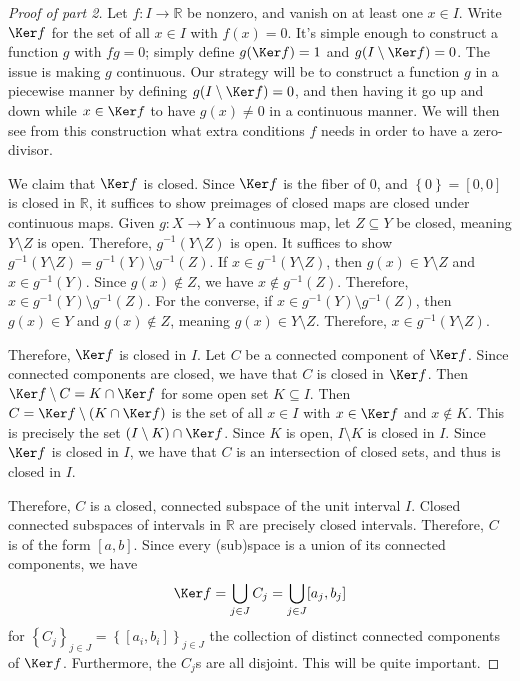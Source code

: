 \documentclass[11pt, letterpaper]{article}
\theoremstyle{plain}
\begin{document}
\begin{proof}[Proof of part 2]
	Let $f : I \to \mathbb{R} $ be nonzero, and vanish on at least one $x\in I$. Write $\Ker f$ for the set of all $x\in I$ with $f(x)=0$. It's simple enough to construct a function $g$ with $fg=0$; simply define $g(\Ker f)=1$ and $g(I \setminus \Ker f)=0$. The issue is making $g$ continuous. Our strategy will be to construct a function $g$ in a piecewise manner by defining $g(I \setminus \Ker f)=0$, and then having it go up and down while $x\in\Ker f$ to have $g(x)\neq 0$ in a continuous manner. We will then see from this construction what extra conditions $f$ needs in order to have a zero-divisor.

	We claim that $\Ker f$ is closed. Since $\Ker f$ is the fiber of 0, and $\left\{ 0 \right\} =[0,0]$ is closed in $\mathbb{R} $, it suffices to show preimages of closed maps are closed under continuous maps. Given $g : X \to Y$ a continuous map, let $Z\subseteq Y$ be closed, meaning $Y\setminus Z$ is open. Therefore, $g^{-1} (Y\setminus Z)$ is open. It suffices to show $g^{-1} (Y\setminus Z)=g^{-1} (Y)\setminus g^{-1} (Z)$. If $x\in g^{-1} (Y\setminus Z)$, then $g(x)\in Y\setminus Z$ and $x\in g^{-1} (Y)$. Since $g(x)\notin Z$, we have $x\notin g^{-1} (Z)$. Therefore, $x\in g^{-1} (Y)\setminus g^{-1} (Z)$. For the converse, if $x\in g^{-1} (Y)\setminus g^{-1} (Z)$, then $g(x)\in Y$ and $g(x)\notin Z$, meaning $g(x)\in Y\setminus Z$. Therefore, $x\in g^{-1} (Y\setminus Z)$.

	Therefore, $\Ker f$ is closed in $I$. Let $C$ be a connected component of $\Ker f$. Since connected components are closed, we have that $C$ is closed in $\Ker f$. Then $\Ker f\setminus C=K \cap \Ker f$ for some open set $K\subseteq I$. Then $C=\Ker f \setminus (K \cap \Ker f)$ is the set of all $x\in I$ with $x\in \Ker f$ and $x\notin K$. This is precisely the set $(I\setminus K) \cap \Ker f$. Since $K$ is open, $I\setminus K$ is closed in $I$. Since $\Ker f$ is closed in $I$, we have that $C$ is an intersection of closed sets, and thus is closed in $I$.

	Therefore, $C$ is a closed, connected subspace of the unit interval $I$. Closed connected subspaces of intervals in $\mathbb{R} $ are precisely closed intervals. Therefore, $C$ is of the form $[a,b]$. Since every (sub)space is a union of its connected components, we have
	\[
		\Ker f=\bigcup_{j\in J} C_j=\bigcup_{j\in J} [a_j,b_j]
	\]
	for $\left\{ C_j \right\}_{j\in J} =\left\{ [a_i,b_i] \right\}_{j\in J} $ the collection of distinct connected components of $\Ker f$. Furthermore, the $C_j$s are all disjoint. This will be quite important.


\end{proof}
\end{document}
